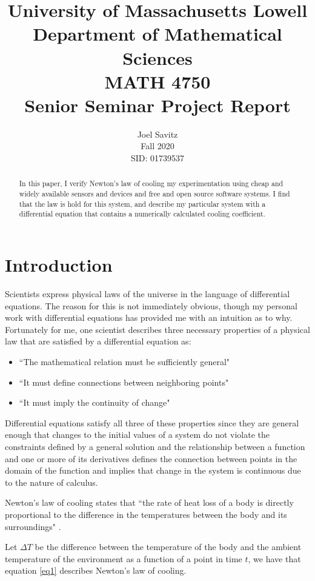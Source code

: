\documentclass[12pt]{article}
\title{ University of Massachusetts Lowell \protect\\
	Department of Mathematical Sciences\protect\\
MATH 4750 \protect\\
Senior Seminar Project Report}
\author{Joel Savitz \\ Fall 2020 \\ SID: 01739537}
\begin{document}
\maketitle

\begin{abstract}
	In this paper,
	I verify Newton's law of cooling my experimentation
	using cheap and widely available sensors and devices
	and free and open source software systems.
	I find that the law is hold for this system,
	and describe my particular system
	with a differential equation
	that contains a numerically calculated cooling coefficient.
\end{abstract}

\section{Introduction}

Scientists express physical laws of
the universe in the language of differential equations.
The reason for this is not immediately obvious,
though my personal work with differential equations
has provided me with an intuition as to why.
Fortunately for me,
one scientist describes three necessary properties
of a physical law that are satisfied by a differential equation as: 


\begin{itemize}
	\item ``The mathematical relation must be sufficiently general"
	\item ``It must define connections between neighboring points"
	\item ``It must imply the continuity of change"\citep{whydiffeq}
\end{itemize}

Differential equations satisfy all three of these properties
since they are general enough that
changes to the initial values of a system
do not violate the constraints defined by a general solution
and the relationship between a function and one or more of its derivatives
defines the connection between points in the domain of the function
and implies that change in the system is continuous
due to the nature of calculus.


Newton's law of cooling states that
``the rate of heat loss of a body is
directly proportional to the difference
in the temperatures between the body and
its surroundings" \citep{wiki}.

Let $\Delta T$ be the difference between
the temperature of the body
and the ambient temperature of the environment
as a function of a point in time $t$,
we have that equation \ref{eq1}
describes Newton's law of cooling.
\end{document}
